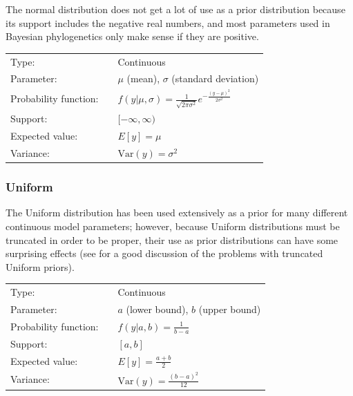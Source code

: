 \documentclass[10pt]{article}
\newcommand{\Var}{\mbox{Var}}
\begin{document}
The normal distribution does not get a lot of use as a prior distribution because its support includes the negative real numbers, and most parameters used in Bayesian phylogenetics only make sense if they are positive.

\begin{tabular}{lcl}
Type:                 & & Continuous \\
Parameter:            & & $\mu$ (mean), $\sigma$ (standard deviation)    \\
Probability function: & & $f(y|\mu,\sigma) = \frac{1}{\sqrt{2 \pi \sigma^2}} e^{-\frac{(y-\mu)^2}{2 \sigma^2}}$ \\
Support:              & & $[-\infty,\infty)$     \\
Expected value:       & & $E[y] = \mu$ \\
Variance:             & & $\Var(y) = \sigma^2$ 
\end{tabular}

\subsubsection{Uniform}\label{uniform}

The Uniform distribution has been used extensively as a prior for many different continuous model parameters; however, because Uniform distributions must be truncated in order to be proper, their use as prior distributions can have some surprising effects (see \citet{Felsenstein2004} for a good discussion of the problems with truncated Uniform priors).

\begin{tabular}{lcl}
Type:                 & & Continuous \\
Parameter:            & & $a$ (lower bound), $b$ (upper bound)    \\
Probability function: & & $f(y|a,b) = \frac{1}{b-a}$ \\
Support:              & & $[a,b]$     \\
Expected value:       & & $E[y] = \frac{a + b}{2}$ \\
Variance:             & & $\Var(y) = \frac{(b - a)^2}{12}$ 
\end{tabular}

\end{document}
